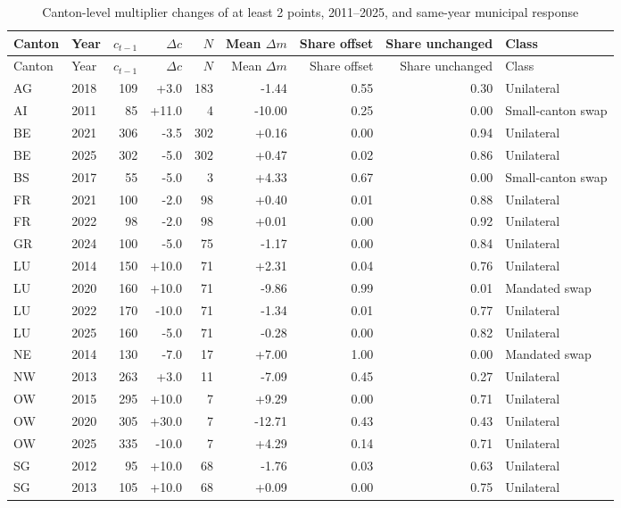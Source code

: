 \begin{longtable}{llrrrrrrl}
\caption{Canton-level multiplier changes of at least 2 points, 2011--2025, and same-year municipal response}\label{tab:events}\\
\toprule
Canton & Year & $c_{t-1}$ & $\Delta c$ & $N$ & Mean $\Delta m$ & Share offset & Share unchanged & Class \\
\midrule
\endfirsthead
\toprule
Canton & Year & $c_{t-1}$ & $\Delta c$ & $N$ & Mean $\Delta m$ & Share offset & Share unchanged & Class \\
\midrule
\endhead
AG & 2018 & 109 & +3.0 & 183 & -1.44 & 0.55 & 0.30 & Unilateral \\
AI & 2011 & 85 & +11.0 & 4 & -10.00 & 0.25 & 0.00 & Small-canton swap \\
BE & 2021 & 306 & -3.5 & 302 & +0.16 & 0.00 & 0.94 & Unilateral \\
BE & 2025 & 302 & -5.0 & 302 & +0.47 & 0.02 & 0.86 & Unilateral \\
BS & 2017 & 55 & -5.0 & 3 & +4.33 & 0.67 & 0.00 & Small-canton swap \\
FR & 2021 & 100 & -2.0 & 98 & +0.40 & 0.01 & 0.88 & Unilateral \\
FR & 2022 & 98 & -2.0 & 98 & +0.01 & 0.00 & 0.92 & Unilateral \\
GR & 2024 & 100 & -5.0 & 75 & -1.17 & 0.00 & 0.84 & Unilateral \\
LU & 2014 & 150 & +10.0 & 71 & +2.31 & 0.04 & 0.76 & Unilateral \\
LU & 2020 & 160 & +10.0 & 71 & -9.86 & 0.99 & 0.01 & Mandated swap \\
LU & 2022 & 170 & -10.0 & 71 & -1.34 & 0.01 & 0.77 & Unilateral \\
LU & 2025 & 160 & -5.0 & 71 & -0.28 & 0.00 & 0.82 & Unilateral \\
NE & 2014 & 130 & -7.0 & 17 & +7.00 & 1.00 & 0.00 & Mandated swap \\
NW & 2013 & 263 & +3.0 & 11 & -7.09 & 0.45 & 0.27 & Unilateral \\
OW & 2015 & 295 & +10.0 & 7 & +9.29 & 0.00 & 0.71 & Unilateral \\
OW & 2020 & 305 & +30.0 & 7 & -12.71 & 0.43 & 0.43 & Unilateral \\
OW & 2025 & 335 & -10.0 & 7 & +4.29 & 0.14 & 0.71 & Unilateral \\
SG & 2012 & 95 & +10.0 & 68 & -1.76 & 0.03 & 0.63 & Unilateral \\
SG & 2013 & 105 & +10.0 & 68 & +0.09 & 0.00 & 0.75 & Unilateral \\

\end{longtable}
